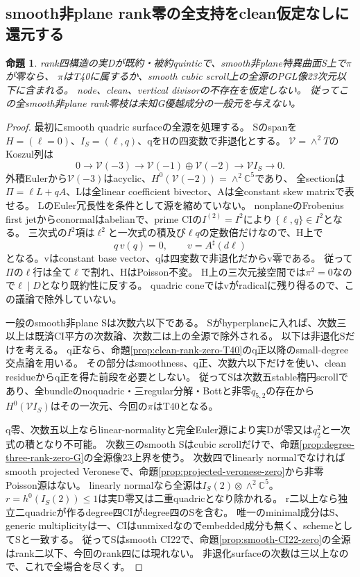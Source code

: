 \documentclass[a4paper,11pt]{ltjsarticle}
\newtheorem{proposition}{命題}[section]
\theoremstyle{definition}
\begin{document}
\subsection{smooth非plane rank零の全支持をclean仮定なしに還元する}
\begin{proposition}\label{prop:smooth-nonplane-rank-zero-all}
rank四構造の実Dが既約・被約quinticで、smooth非plane特異曲面S上で$\pi$が零なら、
$\pi$はT40に属するか、smooth cubic scroll上の全源のPGL像23次元以下に含まれる。
node、clean、vertical divisorの不存在を仮定しない。
従ってこの全smooth非plane rank零枝は未知G優越成分の一般元を与えない。
\end{proposition}
\begin{proof}
最初にsmooth quadric surfaceの全源を処理する。
Sのspanを$H=(\ell=0)$、$I_S=(\ell,q)$、qをHの四変数で非退化とする。
$\mathcal V=\wedge^2T$のKoszul列は
\[
 0\to\mathcal V(-3)\to\mathcal V(-1)\oplus\mathcal V(-2)\to\mathcal V I_S\to0.
\]
外積Eulerから$\mathcal V(-3)$はacyclic、$H^0(\mathcal V(-2))=\wedge^2\mathbb C^5$であり、
全sectionは$\Pi=\ell L+qA$、Lは全linear coefficient bivector、Aは全constant skew matrixで表せる。
LのEuler冗長性を条件として源を縮めていない。
nonplaneのFrobenius first jetからconormalはabelianで、prime CIの$I^{(2)}=I^2$により
$\{\ell,q\}\in I^2$となる。
三次式の$I^2$項は$\ell^2$と一次式の積及び$\ell q$の定数倍だけなので、H上で
\[
 q\,v(q)=0,\qquad v=A^\sharp(d\ell)
\]
となる。vはconstant base vector、qは四変数で非退化だからv零である。
従って$\Pi$の$\ell$行は全て$\ell$で割れ、HはPoisson不変。
H上の三次元接空間では$\pi^2=0$なので$\ell\mid D$となり既約性に反する。
quadric coneではvがradicalに残り得るので、この議論で除外していない。

一般のsmooth非plane Sは次数六以下である。
Sがhyperplaneに入れば、次数三以上は既済CI平方の次数論、次数二は上の全源で除外される。
以下は非退化Sだけを考える。
q正なら、命題\ref{prop:clean-rank-zero-T40}のq正以降のsmall-degree交点論を用いる。
その部分はsmoothness、q正、次数六以下だけを使い、clean residueからq正を得た前段を必要としない。
従ってSは次数五stable楕円scrollであり、全bundleのnoquadric・三regular分解・Bottと非零$q_{5,2}$の存在から
$H^0(\mathcal V I_S)$はその一次元、今回の$\pi$はT40となる。

q零、次数五以上ならlinear-normalityと完全Euler源により実Dが零又は$q_2^2$と一次式の積となり不可能。
次数三のsmooth Sはcubic scrollだけで、命題\ref{prop:degree-three-rank-zero-G}の全源像23上界を使う。
次数四でlinearly normalでなければsmooth projected Veroneseで、命題\ref{prop:projected-veronese-zero}から非零Poisson源はない。
linearly normalなら全源は$I_S(2)\otimes\wedge^2\mathbb C^5$。
$r=h^0(I_S(2))\le1$は実D零又は二重quadricとなり除かれる。
r二以上なら独立二quadricが作るdegree四CIがdegree四のSを含む。
唯一のminimal成分はS、generic multiplicityは一、CIはunmixedなのでembedded成分も無く、schemeとしてSと一致する。
従ってSはsmooth CI22で、命題\ref{prop:smooth-CI22-zero}の全源はrank二以下、今回のrank四には現れない。
非退化surfaceの次数は三以上なので、これで全場合を尽くす。
\end{proof}
\end{document}
